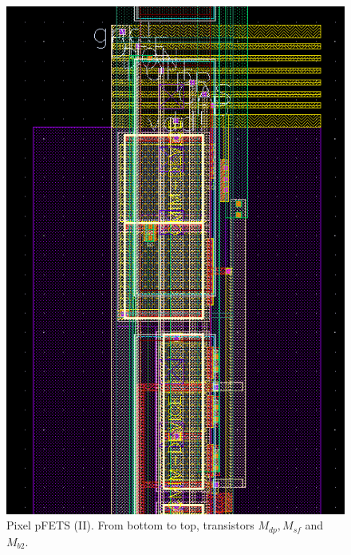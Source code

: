 \begin{figure}
	\center
	\includegraphics{pixel3.png}
	\caption{Pixel pFETS (II). From bottom to top, transistors $M_{dp}, M_{sf}$ and $M_{b2}$.}
	\label{tres}
\end{figure}

